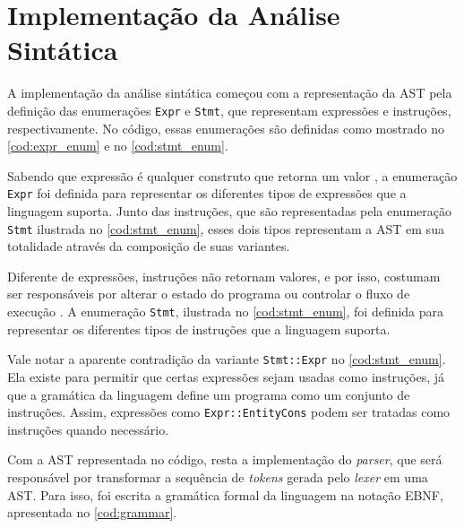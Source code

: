 \section{Implementação da Análise Sintática} \label{sec:analise_sintatica}

A implementação da análise sintática começou com a representação da AST pela definição das enumerações \texttt{Expr} e \texttt{Stmt}, que representam expressões e instruções, respectivamente. No código, essas enumerações são definidas como mostrado no \autoref{cod:expr_enum} e no \autoref{cod:stmt_enum}.

\codigoRust

\vspace{-1em}

Sabendo que expressão é qualquer construto que retorna um valor \cite{craftinginterpreters}, a enumeração \texttt{Expr} foi definida para representar os diferentes tipos de expressões que a linguagem suporta. Junto das instruções, que são representadas pela enumeração \texttt{Stmt} ilustrada no \autoref{cod:stmt_enum}, esses dois tipos representam a AST em sua totalidade através da composição de suas variantes.

Diferente de expressões, instruções não retornam valores, e por isso, costumam ser responsáveis por alterar o estado do programa ou controlar o fluxo de execução \cite{craftinginterpreters}. A enumeração \texttt{Stmt}, ilustrada no \autoref{cod:stmt_enum}, foi definida para representar os diferentes tipos de instruções que a linguagem suporta.

\codigoRust

\vspace{-1em}

Vale notar a aparente contradição da variante \texttt{Stmt::Expr} no \autoref{cod:stmt_enum}. Ela existe para permitir que certas expressões sejam usadas como instruções, já que a gramática da linguagem define um programa como um conjunto de instruções. Assim, expressões como \texttt{Expr::EntityCons} podem ser tratadas como instruções quando necessário.

Com a AST representada no código, resta a implementação do \textit{parser}, que será responsável por transformar a sequência de \textit{tokens} gerada pelo \textit{lexer} em uma AST. Para isso, foi escrita a gramática formal da linguagem na notação EBNF, apresentada no \autoref{cod:grammar}.

